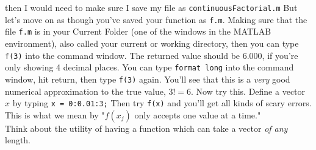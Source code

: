 \documentclass{article}
\begin{document}
{\setlength{\parindent}{0cm}
then I would need to make sure I save my file as \texttt{continuousFactorial.m}} But let's move on as though you've saved your function as \texttt{f.m}. Making sure that the file \texttt{f.m} is in your Current Folder (one of the windows in the MATLAB environment), also called your current or working directory, then you can type \texttt{f(3)} into the command window. The returned value should be $6.000$, if you're only showing 4 decimal places. You can type \texttt{format long} into the command window, hit return, then type \texttt{f(3)} again. You'll see that this is a \textit{very} good numerical approximation to the true value, $3! = 6$. Now try this. Define a vector $x$ by typing \texttt{x = 0:0.01:3;} Then try \texttt{f(x)} and you'll get all kinds of scary errors. This is what we mean by "$f(x_j)$ only accepts one value at a time."\\

Think about the utility of having a function which can take a vector \textit{of any} length.
\end{document}
